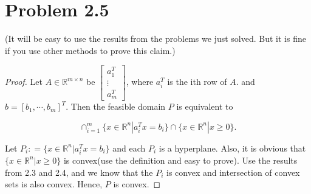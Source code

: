 \documentclass[12pt]{article}
\begin{document}
\section*{Problem 2.5}

(It will be easy to use the results from the problems we just solved. But it is fine if you use other methods to prove this claim.)

\begin{proof}

Let $A \in \mathbb{R}^{m\times n}$ be $\begin{bmatrix}
a_1^T \\
\vdots \\
a_m^T
\end{bmatrix}
$, where $a_i^T$ is the ith row of $A$. 
and $b = [b_1, \cdots, b_m]^T$. Then the feasible domain $P$ is equivalent to 

$$
\cap_{i=1}^m \{ x\in\mathbb{R}^n | a_i^T x = b_i  \} \cap \{x\in\mathbb{R}^n | x \geqslant 0\}.
$$

Let $P_i : = \{ x\in\mathbb{R}^n | a_i^T x = b_i  \}$ and each $P_i$ is a hyperplane. Also, it is obvious that $\{x\in\mathbb{R}^n | x \geqslant 0\}$ is convex(use the definition and easy to prove). Use the results from 2.3 and 2.4, and we know that the $P_i$ is convex and intersection of convex sets is also convex. Hence, $P$ is convex.

\end{proof}
\end{document}
